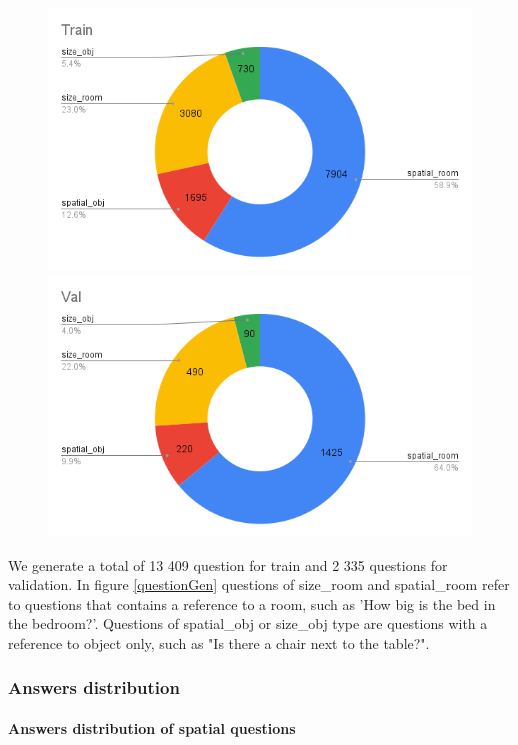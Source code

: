 \begin{figure}[H]
\includegraphics[scale=0.25]{images/GenTrain.png}
\includegraphics[scale=0.25]{images/GenVal.png}
\caption{}
\label{fig:questionGen}
\end{figure}

We generate a total of 13 409 question for train and 2 335 questions for validation.  In figure \ref{questionGen} questions of size\_room and spatial\_room refer to questions that contains a reference to a room, such as 'How big is the bed in the bedroom?'. Questions of spatial\_obj or size\_obj type are questions with a reference to object only, such as "Is there a chair next to the table?". 

\subsubsection{Answers distribution}

\paragraph{Answers distribution of spatial questions}

